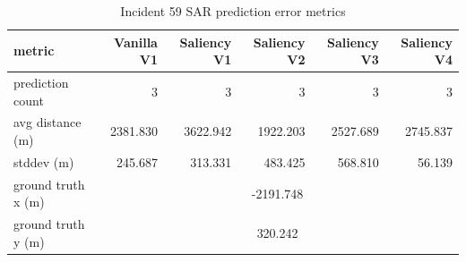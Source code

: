 \begin{table}[ht]
\centering
\caption{Incident 59 SAR prediction error metrics}
\label{tab:sar-incident-59}
\begin{tabular}{lrrrrr}
\hline
metric & Vanilla V1 & Saliency V1 & Saliency V2 & Saliency V3 & Saliency V4 \\
\hline
prediction count & 3 & 3 & 3 & 3 & 3 \\
avg distance (m) & 2381.830 & 3622.942 & 1922.203 & 2527.689 & 2745.837 \\
stddev (m) & 245.687 & 313.331 & 483.425 & 568.810 & 56.139 \\
ground truth x (m) & \multicolumn{5}{c}{-2191.748} \\
ground truth y (m) & \multicolumn{5}{c}{320.242} \\
\hline
\end{tabular}
\end{table}
